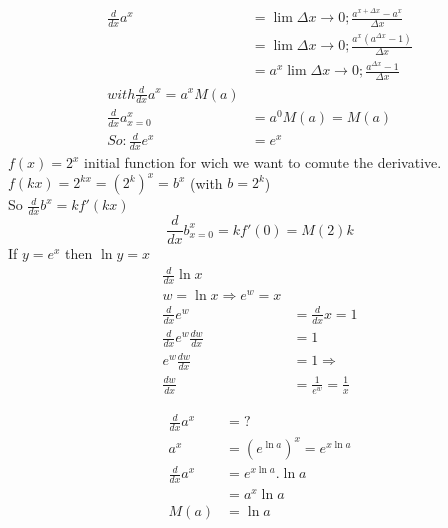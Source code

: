 \documentclass{article}
\begin{document}
                    \begin{align*}
                        \frac{d}{dx} a^x &= \lim {\Delta x \to 0} ; \frac{a^{x+\Delta x} - a^x}{\Delta x}\\
                        &= \lim {\Delta x \to 0} ; \frac{a^x (a^{\Delta x} -1)}{\Delta x}\\
                        &= a^x \lim {\Delta x \to 0} ; \frac{a^{\Delta x} -1}{\Delta x}\\
                        with \frac{d}{dx} a^x = a^x M(a)\\
                        \frac{d}{dx}a^x_{x=0} &= a^0 M(a) = M(a)\\
                        So :
                        \frac{d}{dx} e^x &= e^x
                    \end{align*}
                    $f(x) = 2^x$ initial function for wich we want to comute the derivative.\\
                    $f(kx) = 2^{kx} = (2^k)^x = b^x$ (with $b=2^k$)\\
                    So $\frac{d}{dx}b^x = kf'(kx)$
                    \[ \frac{d}{dx}b^x_{x=0} = kf'(0) = M(2)k \]
                    If $y=e^x$ then $\ln y = x$\\

                    \begin{align*}
                        \frac{d}{dx} \ln x\\
                        w = \ln x \Rightarrow e^w = x\\
                        \frac{d}{dx} e^w &= \frac{d}{dx} x = 1\\
                        \frac{d}{dx} e^w \frac{dw}{dx} &= 1\\
                        e^w \frac{dw}{dx} &= 1 \Rightarrow \\
                        \frac{dw}{dx} &= \frac{1}{e^w} = \frac{1}{x}
                    \end{align*}

                    \begin{align*}
                        \frac{d}{dx} a^x &= ?\\
                        a^x &= (e^{\ln a})^x = e^{x\ln a}\\
                        \frac{d}{dx} a^x &= e^{x\ln a} . \ln a\\
                        &= a^x \ln a\\
                        M(a) &= \ln a
                    \end{align*}
\end{document}
